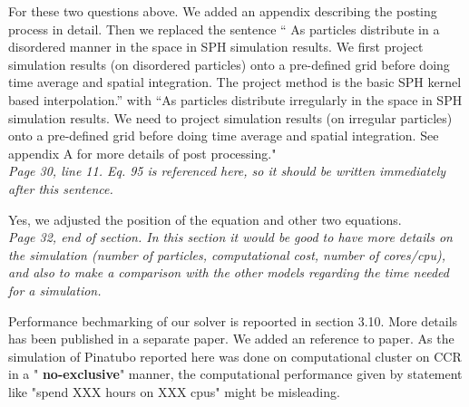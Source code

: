 \documentclass[10pt,a4paper]{article}
\begin{document}
For these two questions above. We added an appendix describing the posting process in detail. Then we replaced the sentence “ As particles distribute in a disordered manner in the space in SPH
simulation results. We first project simulation results (on disordered particles) onto a pre-defined grid before doing time average and spatial integration. The project method is the basic SPH kernel based interpolation.”  with “As particles distribute irregularly in the space in SPH simulation results. We need to project simulation results (on irregular particles) onto a pre-defined grid before doing time average and spatial integration. See appendix A for more details of post processing."\\[3pt]

\textit{Page 30, line 11. Eq. 95 is referenced here, so it should be written immediately after this sentence.}

Yes, we adjusted the position of the equation and other two equations.\\[3pt]

\textit{Page 32, end of section. In this section it would be good to have more details on the simulation (number of particles, computational cost, number of cores/cpu), and also to make a comparison with the other models regarding the time needed for a simulation.}


Performance bechmarking of our solver is repoorted in section 3.10. More details has been published in a separate paper. We added an reference to paper.  As the simulation of Pinatubo reported here was done on computational cluster on CCR in a " \textbf{no-exclusive}" manner, the computational performance given by statement like "spend XXX hours on XXX cpus" might be misleading. 
\end{document}
